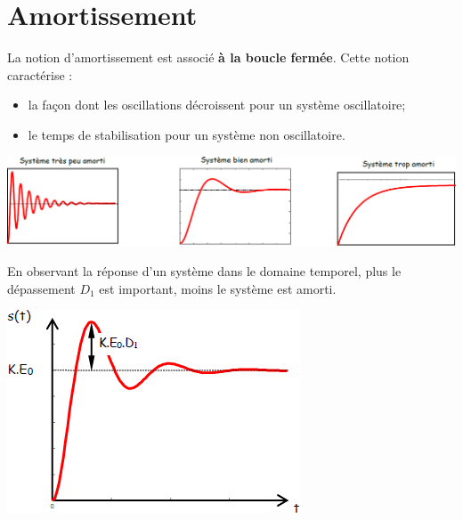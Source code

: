 \documentclass[10pt,fleqn]{article} %
\begin{document}

\vspace{2cm}
\pagestyle{fancy}
\thispagestyle{plain}

\section{Amortissement}
La notion d'amortissement est associé \textbf{à la boucle fermée}. Cette notion caractérise :  
\begin{itemize}
\item la façon dont les oscillations décroissent pour un système oscillatoire;
\item le temps de stabilisation pour un système non oscillatoire.
\end{itemize}
\begin{center}
\includegraphics[width=\linewidth]{images/amortissement}
\end{center}

\noindent\begin{minipage}[c]{.7\linewidth}
\begin{resultat}
En observant la réponse d'un système dans le domaine temporel, plus le dépassement $D_1$ est important, moins le système est amorti.
\end{resultat}
\end{minipage} \hfill
\begin{minipage}[c]{.25\linewidth}
\begin{center}
\includegraphics[width=\linewidth]{images/depassement}
\end{center}
\end{minipage}
\end{document}
